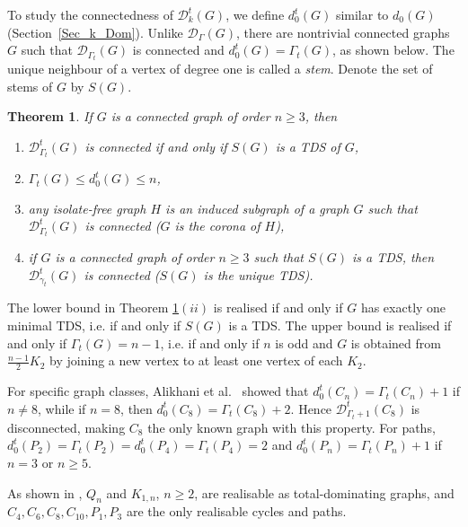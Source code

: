 \documentclass[12pt]{article}%
\newtheorem{theorem}{Theorem}[section]
\begin{document}
To study the connectedness of $\mathcal{D}_{k}^{t}(G)$, we define $d_{0}%
^{t}(G)$ similar to $d_{0}(G)$ (Section~\ref{Sec_k_Dom}). Unlike
$\mathcal{D}_{\Gamma}(G)$, there are nontrivial connected graphs $G$ such that
$\mathcal{D}_{\Gamma_{t}}(G)$ is connected and $d_{0}^{t}(G)=\Gamma_{t}(G)$,
as shown below. The unique neighbour of a vertex of degree one is called a
\emph{stem}. Denote the set of stems of $G$ by $S(G)$.

\begin{theorem}
\label{Thm_TDS}\emph{\cite{26CM-AFM}}\hspace{0.1in}If $G$ is a connected graph
of order $n\geq3$, then

\begin{enumerate}
\item[$(i)$] $\mathcal{D}_{\Gamma_{t}}^{t}(G)$ is connected if and only if
$S(G)$ is a TDS of $G$,

\item[$(ii)$] $\Gamma_{t}(G)\leq d_{0}^{t}(G)\leq n$,

\item[$(iii)$] any isolate-free graph $H$ is an induced subgraph of a graph
$G$ such that $\mathcal{D}_{\Gamma_{t}}^{t}(G)$ is connected ($G$ is the
corona of $H$),

\item[$(iv)$] if $G$ is a connected graph of order $n\geq3$ such that $S(G)$
is a TDS, then $\mathcal{D}_{\gamma_{t}}^{t}(G)$ is connected ($S(G)$ is the
unique TDS).
\end{enumerate}
\end{theorem}

The lower bound in Theorem \ref{Thm_TDS}$(ii)$ is realised if and only if $G$
has exactly one minimal TDS, i.e. if and only if $S(G)$ is a TDS. The upper
bound is realised if and only if $\Gamma_{t}(G)=n-1$, i.e. if and only if $n$
is odd and $G$ is obtained from $\frac{n-1}{2}K_{2}$ by joining a new vertex
to at least one vertex of each $K_{2}$.

For specific graph classes, Alikhani et al.~\cite{26CM-AFM} showed that
$d_{0}^{t}(C_{n})=\Gamma_{t}(C_{n})+1$ if $n\neq8$, while if $n=8$, then
$d_{0}^{t}(C_{8})=\Gamma_{t}(C_{8})+2$. Hence $\mathcal{D}_{\Gamma_{t}+1}%
^{t}(C_{8})$ is disconnected, making $C_{8}$ the only known graph with this
property. For paths, $d_{0}^{t}(P_{2})=\Gamma_{t}(P_{2})=d_{0}^{t}%
(P_{4})=\Gamma_{t}(P_{4})=2$ and $d_{0}^{t}(P_{n})=\Gamma_{t}(P_{n})+1$ if
$n=3$ or $n\geq5$.

As shown in \cite{26CM-AFM}, $Q_{n}$ and $K_{1,n}$, $n\geq2$, are realisable
as total-dominating graphs, and $C_{4},C_{6},C_{8},C_{10},P_{1},P_{3}$ are the
only realisable cycles and paths.
\end{document}
